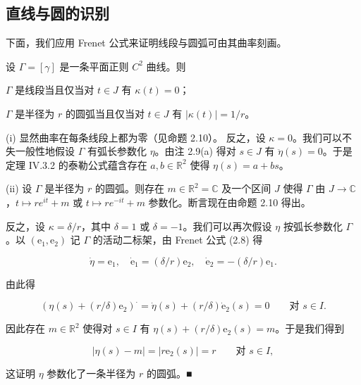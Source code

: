 \subsection*{直线与圆的识别}

下面，我们应用 Frenet 公式来证明线段与圆弧可由其曲率刻画。

\begin{proposition}

设 $ \Gamma = [\gamma] $ 是一条平面正则 $ C^{2} $ 曲线。则

\begin{subitems}
\item

$ \Gamma $ 是线段当且仅当对 $ t \in J $ 有 $ \kappa(t) = 0 $；

\item

$ \Gamma $ 是半径为 $ r $ 的圆弧当且仅当对 $ t \in J $ 有 $ |\kappa(t)| = 1/r $。

\proofhead
(i) 显然曲率在每条线段上都为零（见命题 2.10）。
反之，设 $ \kappa = 0 $。我们可以不失一般性地假设 $ \Gamma $ 有弧长参数化 $ \eta $。由注 2.9(a) 得对 $ s \in J $ 有 $ \ddot{\eta}(s) = 0 $。于是定理 IV.3.2 的泰勒公式蕴含存在 $ a, b \in \mathbb{R}^{2} $ 使得 $ \eta(s) = a + bs $。
\end{subitems}

(ii) 设 $ \Gamma $ 是半径为 $ r $ 的圆弧。则存在 $ m \in \mathbb{R}^{2} = \mathbb{C} $ 及一个区间 $ J $ 使得 $ \Gamma $ 由 $ J \to \mathbb{C} $，$ t \mapsto re^{it} + m $ 或 $ t \mapsto re^{-it} + m $ 参数化。断言现在由命题 2.10 得出。

反之，设 $ \kappa = \delta/r $，其中 $ \delta = 1 $ 或 $ \delta = -1 $。我们可以再次假设 $ \eta $ 按弧长参数化 $ \Gamma $。以 $ (\mathrm{e}_{1}, \mathrm{e}_{2}) $ 记 $ \Gamma $ 的活动二标架，由 Frenet 公式 (2.8) 得

\[
\dot{\eta} = \mathrm{e}_{1} , \quad \dot{\mathrm{e}}_{1} = (\delta/r)\mathrm{e}_{2} , \quad \dot{\mathrm{e}}_{2} = -(\delta/r)\mathrm{e}_{1} .
\]

由此得

\[
\left(\eta(s) + (r/\delta)\mathrm{e}_{2}\right)^{\cdot} = \dot{\eta}(s) + (r/\delta)\dot{\mathrm{e}}_{2}(s) = 0 \qquad \text{对 } s \in I .
\]

因此存在 $ m \in \mathbb{R}^{2} $ 使得对 $ s \in I $ 有 $ \eta(s) + (r/\delta)\mathrm{e}_{2}(s) = m $。于是我们得到

\[
|\eta(s) - m| = |r\mathrm{e}_{2}(s)| = r \qquad \text{对 } s \in I ,
\]

这证明 $ \eta $ 参数化了一条半径为 $ r $ 的圆弧。\nobreak\hspace{0.35em}■

\end{proposition}

